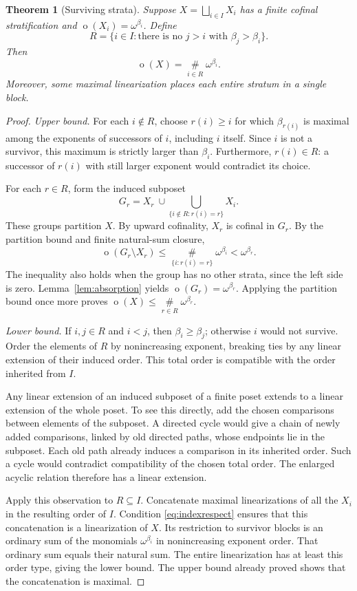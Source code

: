 \documentclass[11pt,a4paper]{article}
\newtheorem{theorem}{Theorem}[section]
\theoremstyle{definition}
\theoremstyle{remark}
\newcommand{\ot}{\operatorname{o}}
\newcommand{\bigns}{\mathop{\#}\limits}
\begin{document}
\begin{theorem}[Surviving strata]\label{thm:strata}
Suppose $X=\bigsqcup_{i\in I}X_i$ has a finite cofinal stratification and
$\ot(X_i)=\omega^{\beta_i}$. Define
\[
 R=\{i\in I:\text{there is no }j>i\text{ with }\beta_j>\beta_i\}.
\]
Then
\begin{equation}\label{eq:strataformula}
 \boxed{\displaystyle \ot(X)=\bigns_{i\in R}\omega^{\beta_i}.}
\end{equation}
Moreover, some maximal linearization places each entire stratum in a
single block.
\end{theorem}

\begin{proof}
\emph{Upper bound.} For each $i\notin R$, choose $r(i)\ge i$ for which
$\beta_{r(i)}$ is maximal among the exponents of successors of $i$,
including $i$ itself. Since $i$ is not a survivor, this maximum is strictly
larger than $\beta_i$. Furthermore, $r(i)\in R$: a successor of $r(i)$ with
still larger exponent would contradict its choice.

For each $r\in R$, form the induced subposet
\[
 G_r=X_r\ \cup\!\!\bigcup_{\{i\notin R:r(i)=r\}}X_i.
\]
These groups partition $X$. By upward cofinality, $X_r$ is cofinal in
$G_r$. By the partition bound and finite natural-sum closure,
\[
 \ot(G_r\setminus X_r)
 \le\bigns_{\{i:r(i)=r\}}\omega^{\beta_i}
 <\omega^{\beta_r}.
\]
The inequality also holds when the group has no other strata, since the
left side is zero. Lemma~\ref{lem:absorption} yields
$\ot(G_r)=\omega^{\beta_r}$. Applying the partition bound once more proves
$\ot(X)\le\bigns_{r\in R}\omega^{\beta_r}$.

\emph{Lower bound.} If $i,j\in R$ and $i<j$, then $\beta_i\ge\beta_j$;
otherwise $i$ would not survive. Order the elements of $R$ by
nonincreasing exponent, breaking ties by any linear extension of their
induced order. This total order is compatible with the order inherited
from $I$.

Any linear extension of an induced subposet of a finite poset extends to a
linear extension of the whole poset. To see this directly, add the chosen
comparisons between elements of the subposet. A directed cycle would give
a chain of newly added comparisons, linked by old directed paths, whose
endpoints lie in the subposet. Each old path already induces a comparison
in its inherited order. Such a cycle would contradict compatibility of
the chosen total order. The enlarged acyclic relation therefore has a
linear extension.

Apply this observation to $R\subseteq I$. Concatenate maximal
linearizations of all the $X_i$ in the resulting order of $I$. Condition
\eqref{eq:indexrespect} ensures that this concatenation is a linearization
of $X$. Its restriction to survivor blocks is an ordinary sum of the
monomials $\omega^{\beta_i}$ in nonincreasing exponent order. That ordinary
sum equals their natural sum. The entire linearization has at least this
order type, giving the lower bound. The upper bound already proved shows
that the concatenation is maximal.
\end{proof}
\end{document}
